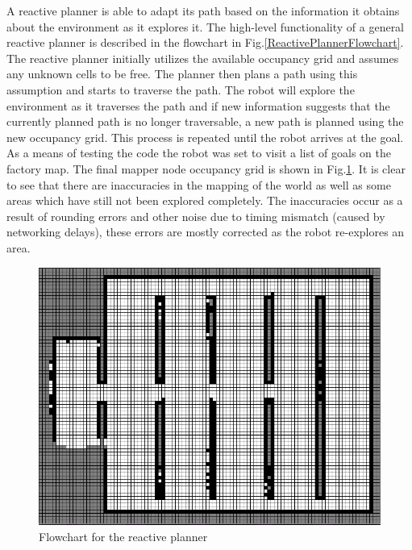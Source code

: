 \documentclass[a4paper,12pt]{article}
\begin{document}
		A reactive planner is able to adapt its path based on the information it obtains about the environment as it explores it. The high-level functionality of a general reactive planner is described in the flowchart in Fig.\ref{ReactivePlannerFlowchart}. The reactive planner initially utilizes the available occupancy grid and assumes any unknown cells to be free. The planner then plans a path using this assumption and starts to traverse the path. The robot will explore the environment as it traverses the path and if new information suggests that the currently planned path is no longer traversable, a new path is planned using the new occupancy grid. This process is repeated until the robot arrives at the goal.
		\\
		As a means of testing the code the robot was set to visit a list of goals on the factory map. The final mapper node occupancy grid is shown in Fig.\ref{mapperNodeOccupancyGrid}. It is clear to see that there are inaccuracies in the mapping of the world as well as some areas which have still not been explored completely. The inaccuracies occur as a result of rounding errors and other noise due to timing mismatch (caused by networking delays), these errors are mostly corrected as the robot re-explores an area. 

		\begin{figure}[H]
			\label{mapperNodeOccupancyGrid}
			\centering
			
			\includegraphics[scale=0.3]{images/mapperNodeOccupancyGrid.png}
			\caption{Flowchart for the reactive planner}
		\end{figure}
\end{document}
